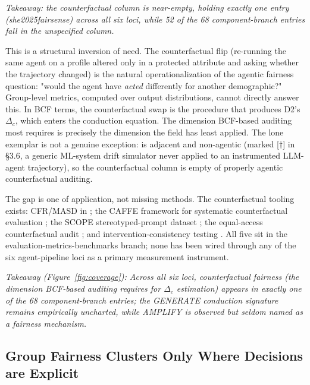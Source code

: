 \documentclass[acmsmall,nonacm]{acmart}
\begin{document}
\emph{Takeaway: the counterfactual column is near-empty, holding exactly one entry (she2025fairsense) across all six loci, while 52 of the 68 component-branch entries fall in the unspecified column.}

This is a structural inversion of need. The counterfactual flip (re-running the same agent on a profile altered only in a protected attribute and asking whether the trajectory changed) is the natural operationalization of the agentic fairness question: "would the agent have \emph{acted} differently for another demographic?" Group-level metrics, computed over output distributions, cannot directly answer this. In BCF terms, the counterfactual swap is the procedure that produces D2's $\Delta_c$, which enters the conduction equation. The dimension BCF-based auditing most requires is precisely the dimension the field has least applied. The lone exemplar is not a genuine exception: \cite{she2025fairsense} is adjacent and non-agentic (marked [$\dagger$] in \S{}3.6, a generic ML-system drift simulator never applied to an instrumented LLM-agent trajectory), so the counterfactual column is empty of properly agentic counterfactual auditing.

The gap is one of application, not missing methods. The counterfactual tooling exists: CFR/MASD in \cite{mayilvaghanan2026counterfactual}; the CAFFE framework for systematic counterfactual evaluation \cite{parziale2025systematic}; the SCOPE stereotyped-prompt dataset \cite{parziale2026scope}; the equal-access counterfactual audit \cite{amirimargavi2026equal}; and intervention-consistency testing \cite{basu2026names}. All five sit in the evaluation-metrics-benchmarks branch; none has been wired through any of the six agent-pipeline loci as a primary measurement instrument.

\emph{Takeaway (Figure~\ref{fig:coverage}): Across all six loci, counterfactual fairness (the dimension BCF-based auditing requires for $\Delta_c$ estimation) appears in exactly one of the 68 component-branch entries; the GENERATE conduction signature remains empirically uncharted, while AMPLIFY is observed but seldom named as a fairness mechanism.}

\subsection{Group Fairness Clusters Only Where Decisions are Explicit}
\end{document}
